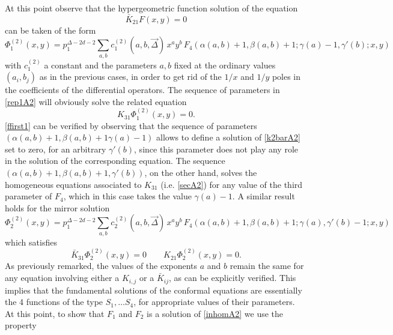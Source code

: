 \documentclass[a4paper,11pt,openright,twoside]{book}
\numberwithin{equation}{section}
\begin{document}
{{{At this point observe that the hypergeometric function solution of the equation
\begin{equation}
	\label{ffirst1}
	\bar{K}_{21}F(x,y)=0
\end{equation}
can be taken of the form
\begin{equation}
	\label{rep1A2}
	\Phi_1^{(2)}(x,y)=p_1^{\Delta-2 d - 2}\sum_{a,b} c^{(2)}_1(a,b,\vec{\Delta})\,x^a y^b \,F_4(\alpha(a,b) +1, \beta(a,b)+1; \gamma(a)-1, \gamma'(b) ; x, y) 
\end{equation}
with $c^{(2)}_1$ a constant and the parameters $a,b$ fixed at the ordinary values $(a_i,b_j)$ as in the previous cases, in order to get rid of the $1/x$ and $1/y$ poles in the coefficients of the differential operators. The sequence of parameters in \eqref{rep1A2} will obviously solve the related equation 
\begin{equation}
	\label{secA2}
	{K}_{31}\Phi_1^{(2)}(x,y)=0. 
\end{equation}
\eqref{ffirst1} can be verified by observing that the sequence of  parameters 
$(\alpha(a,b)+1,\beta(a,b)+1 \gamma(a)-1)$ allows to define a solution of \eqref{k2barA2} set to zero, for an arbitrary $\gamma'(b)$, since this parameter does not play any role in the solution of the corresponding equation. 
The sequence $(\alpha(a,b)+1,\beta(a,b)+1, \gamma'(b))$, on the other hand, solves the homogeneous equations associated to $K_{31}$ (i.e. \eqref{secA2}) for any value of the third parameter of $F_4$, which in this case takes the value $\gamma(a)-1$.
A similar result holds for the mirror solution
\begin{equation} 
	\label{repA2}
	\Phi_2^{(2)}(x,y)= p_1^{\Delta-2 d - 2}\sum_{a,b} c_2^{(2)}(a,b,\vec{\Delta})\,x^a y^b \,F_4(\alpha(a,b) +1, \beta(a,b)+1; \gamma(a), \gamma'(b)-1 ; x, y) 
\end{equation}
which satisfies 
\begin{equation}
	\label{firstA2}
	\bar{K}_{31}\Phi_2^{(2)}(x,y)=0 \qquad  {K}_{21}\Phi_2^{(2)}(x,y)=0. 
\end{equation}
As previously remarked, the values of the exponents $a$ and $b$ remain the same for any equation involving either a $K_{i,j}$ or a $\bar{K}_{i j}$, as can be explicitly verified. This implies that the fundamental solutions of the conformal equations are essentially the 4 functions of the type $S_1,\ldots S_4$, for appropriate values of their parameters.  \\
At this point, to show that $F_1$ and $F_2$ is a solution of  \eqref{inhomA2} we use the property 
}}}
\end{document}
